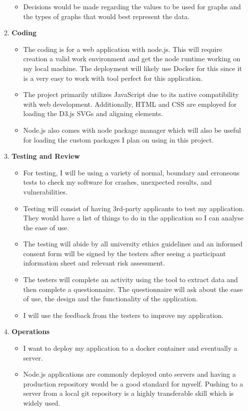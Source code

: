 \documentclass{report}
\begin{document}
\begin{enumerate}
\begin{itemize}
        \item Decisions would be made regarding the values to be used for graphs and the types of graphs that would best represent the data.
    \end{itemize}
    \item \textbf{\large{Coding}}
    \begin{itemize}
        \item The coding is for a web application with node.js. This will require creation a valid work environment and get the node runtime working on my local machine. The deployment will likely use Docker for this since it is a very easy to work with tool perfect for this application.
        \item The project primarily utilizes JavaScript due to its native compatibility with web development. Additionally, HTML and CSS are employed for loading the D3.js SVGs and aligning elements.
        \item Node.js also comes with node package manager which will also be useful for loading the custom packages I plan on using in this project.
    \end{itemize}
    \item \textbf{\large{Testing and Review}}
    \begin{itemize}
        \item For testing, I will be using a variety of normal, boundary and erroneous tests to check my software for crashes, unexpected results, and vulnerabilities.
        \item Testing will consist of having 3rd-party applicants to test my application. They would have a list of things to do in the application so I can analyse the ease of use.
        \item The testing will abide by all university ethics guidelines and an informed consent form will be signed by the testers after seeing a participant information sheet and relevant risk assessment.
        \item The testers will complete an activity using the tool to extract data and then complete a questionnaire. The questionnaire will ask about the ease of use, the design and the functionality of the application.
        \item I will use the feedback from the testers to improve my application.
    \end{itemize}
    \item \textbf{\large{Operations}}
    \begin{itemize}
        \item I want to deploy my application to a docker container and eventually a server.
        \item Node.js applications are commonly deployed onto servers and having a production repository would be a good standard for myself. Pushing to a server from a local git repository is a highly transferable skill which is widely used.
    \end{itemize}
\end{enumerate}
\end{document}
